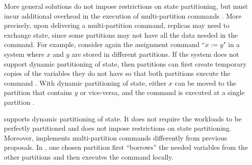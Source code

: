 More general solutions do not impose restrictions on state partitioning, but must incur additional overhead in the execution of multi-partition commands \cite{bezerra2014ssmr, corbett2013spanner}.
More precisely, upon delivering a multi-partition command, replicas may need to exchange state, since some partitions may not have all the data needed in the command.
For example, consider again the assignment command ``$x := y$" in a system where $x$ and $y$ are stored in different partitions.
If the system does not support dynamic partitioning of state, then partitions can first create temporary copies of the variables they do not have so that both partitions execute the command \cite{bezerra2014ssmr}.
With dynamic partitioning of state, either $x$ can be moved to the partition that contains $y$ or vice-versa, and the command is executed at a single partition \cite{hoang2016}.

\dynastar supports dynamic partitioning of state.
It does not require the workloads to be perfectly partitioned and does not impose restrictions on state partitioning.
Moreover, \dynastar implements multi-partition commands differently from previous proposals.
In \dynastar, one chosen partition first ``borrows'' the needed variables from the other partitions and then executes the command locally.

